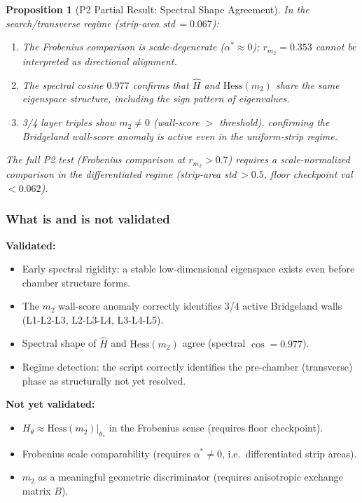 \documentclass[11pt]{amsart}
\newtheorem{proposition}[theorem]{Proposition}
\begin{document}
\begin{proposition}[P2 Partial Result: Spectral Shape Agreement]
\label{prop:p2_partial}
In the search/transverse regime (strip-area std\,$=0.067$):
\begin{enumerate}
\item The Frobenius comparison is scale-degenerate ($\alpha^*\approx 0$);
  $r_{m_2} = 0.353$ cannot be interpreted as directional alignment.
\item The spectral cosine $0.977$ confirms that $\hat{H}$ and
  $\mathrm{Hess}(m_2)$ share the same eigenspace structure,
  including the sign pattern of eigenvalues.
\item 3/4 layer triples show $m_2 \neq 0$ (wall-score $>$ threshold),
  confirming the Bridgeland wall-score anomaly is active even in
  the uniform-strip regime.
\end{enumerate}
The full P2 test (Frobenius comparison at $r_{m_2} > 0.7$) requires
a scale-normalized comparison in the differentiated regime
(strip-area std\,$>0.5$, floor checkpoint val\,$<0.062$).
\end{proposition}

\subsubsection*{What is and is not validated}

\textbf{Validated:}
\begin{itemize}
\item Early spectral rigidity: a stable low-dimensional eigenspace
  exists even before chamber structure forms.
\item The $m_2$ wall-score anomaly correctly identifies 3/4 active
  Bridgeland walls (L1-L2-L3, L2-L3-L4, L3-L4-L5).
\item Spectral shape of $\hat{H}$ and $\mathrm{Hess}(m_2)$ agree
  (spectral $\cos = 0.977$).
\item Regime detection: the script correctly identifies the
  pre-chamber (transverse) phase as structurally not yet resolved.
\end{itemize}

\textbf{Not yet validated:}
\begin{itemize}
\item $H_\theta \approx \mathrm{Hess}(m_2)|_{\theta_*}$
  in the Frobenius sense (requires floor checkpoint).
\item Frobenius scale comparability (requires $\alpha^* \neq 0$,
  i.e.\ differentiated strip areas).
\item $m_2$ as a meaningful geometric discriminator
  (requires anisotropic exchange matrix $B$).
\end{itemize}
\end{document}
